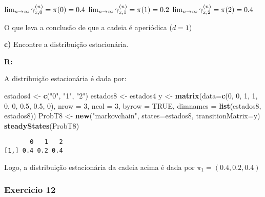 \documentclass[
]{article}
\newenvironment{Shaded}{\begin{snugshade}}{\end{snugshade}}
\newcommand{\DataTypeTok}[1]{\textcolor[rgb]{0.13,0.29,0.53}{#1}}
\newcommand{\DecValTok}[1]{\textcolor[rgb]{0.00,0.00,0.81}{#1}}
\newcommand{\FloatTok}[1]{\textcolor[rgb]{0.00,0.00,0.81}{#1}}
\newcommand{\KeywordTok}[1]{\textcolor[rgb]{0.13,0.29,0.53}{\textbf{#1}}}
\newcommand{\NormalTok}[1]{#1}
\newcommand{\OtherTok}[1]{\textcolor[rgb]{0.56,0.35,0.01}{#1}}
\newcommand{\StringTok}[1]{\textcolor[rgb]{0.31,0.60,0.02}{#1}}
\begin{document}
\(\lim_{n\rightarrow \infty }\gamma^{(n)}_{x,0} = \pi(0) = 0.4\\\)
\(\lim_{n\rightarrow \infty }\gamma^{(n)}_{x,1} = \pi(1) = 0.2\\\)
\(\lim_{n\rightarrow \infty }\gamma^{(n)}_{x,2} = \pi(2) = 0.4\\\)

O que leva a conclusão de que a cadeia é aperiódica (\(d = 1\))

\textbf{c)} Encontre a distribuição estacionária.

\textbf{R:}

A distribuição estacionária é dada por:

\begin{Shaded}
\begin{Highlighting}[]
\NormalTok{estados4 <-}\StringTok{ }\KeywordTok{c}\NormalTok{(}\StringTok{"0"}\NormalTok{, }\StringTok{"1"}\NormalTok{, }\StringTok{"2"}\NormalTok{)}
\NormalTok{estados8 <-}\StringTok{ }\NormalTok{estados4}
\NormalTok{y <-}\StringTok{ }\KeywordTok{matrix}\NormalTok{(}\DataTypeTok{data=}\KeywordTok{c}\NormalTok{(}\DecValTok{0}\NormalTok{, }\DecValTok{0}\NormalTok{, }\DecValTok{1}\NormalTok{, }\DecValTok{1}\NormalTok{, }\DecValTok{0}\NormalTok{, }\DecValTok{0}\NormalTok{, }\FloatTok{0.5}\NormalTok{, }\FloatTok{0.5}\NormalTok{, }\DecValTok{0}\NormalTok{), }\DataTypeTok{nrow =} \DecValTok{3}\NormalTok{, }\DataTypeTok{ncol =} \DecValTok{3}\NormalTok{, }\DataTypeTok{byrow =} \OtherTok{TRUE}\NormalTok{,}
\DataTypeTok{dimnames =} \KeywordTok{list}\NormalTok{(estados8, estados8))}
\NormalTok{ProbT8 <-}\StringTok{ }\KeywordTok{new}\NormalTok{(}\StringTok{"markovchain"}\NormalTok{, }\DataTypeTok{states=}\NormalTok{estados8, }\DataTypeTok{transitionMatrix=}\NormalTok{y)}
\KeywordTok{steadyStates}\NormalTok{(ProbT8)}
\end{Highlighting}
\end{Shaded}

\begin{verbatim}
       0   1   2
[1,] 0.4 0.2 0.4
\end{verbatim}

Logo, a distribuição estacionária da cadeia acima é dada por
\(\pi_{1} = (0.4, 0.2, 0.4)\)

\pagebreak

\hypertarget{exercicio-12}{%
\subsubsection{Exercicio 12}\label{exercicio-12}}
\end{document}
